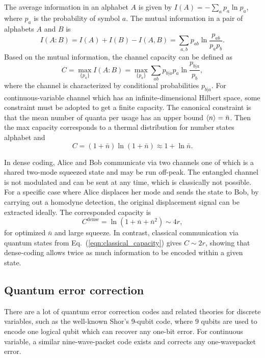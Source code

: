 \documentclass[%
 reprint,
groupedaddress,
showpacs,
 amsmath,amssymb,
 aps,
prb,
]{revtex4-1}
\begin{document}
		The average information in an alphabet $A$ is given by $ I(A) =-\sum_a p_a \ln p_a $, where $p_a $ is the probability of symbol $a$. The mutual information in a pair of alphabets $A$ and $B$ is
		\begin{equation}
		I(A:B)=I(A)+I(B)-I(A,B)=\sum_{a,b} p_{ab}\ln \frac{p_{ab}}{p_a p_b}.
		\end{equation}
		Based on the mutual information, the channel capacity can be defined as
		\begin{equation}
		C = \max_{\{ p_a \}} I(A:B) = \max_{\{ p_a \}} \sum_{ab}p_{b|a} p_a \ln \frac{p_{b|a}}{p_b} ,
		\end{equation}
		where the channel is characterized by conditional probabilities $ p_{b|a} $. For continuous-variable channel which has an infinite-dimensional Hilbert space, some constraint must be adopted to get a finite capacity. The canonical constraint is that the mean number of quanta per usage has an upper bound $ \braket{n} = \bar n $. Then the max capacity corresponds to a thermal distribution for number states alphabet\cite{PhysRevLett.70.363} and
		\begin{equation}
		\label{eqn:classical_capacity}
		C = (1+\bar n)\ln (1+\bar n)\approx 1+\ln \bar n.
		\end{equation}

		In dense coding, Alice and Bob communicate via two channels one of which is a shared two-mode squeezed state and may be run off-peak. The entangled channel is not modulated and can be sent at any time, which is classically not possible. For a specific case where Alice displaces her mode and sends the state to Bob, by carrying out a homodyne detection, the original displacement signal can be extracted ideally. The corresponded capacity is\cite{Braunstein2005}
		\begin{equation}
		C^{\text{dense}} = \ln(1+\bar n +\bar n^2)\sim4r,
		\end{equation}
		for optimized $\bar n$ and large squeeze. In contrast, classical communication via quantum states from Eq.~(\ref{eqn:classical_capacity}) gives $ C\sim 2r $, showing that dense-coding allows twice as much information to be encoded within a given state.
		

	\subsection{Quantum error correction} %
	\label{sub:quantum_error_correction}
		There are a lot of quantum error correction codes and related theories for discrete variables, such as the well-known Shor's 9-qubit code, where 9 qubits are used to encode one logical qubit which can recover any one-bit error. For continuous variable, a similar nine-wave-packet code exists\cite{PhysRevLett.80.4084,nature.10.1038.27850} and corrects any one-wavepacket error.
\end{document}
